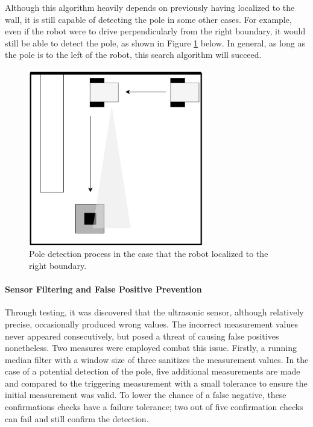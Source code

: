 \documentclass[ece]{uw-wkrpt}
\begin{document}
Although this algorithm heavily depends on previously having localized to the wall, it is still capable of detecting the pole in some other cases. For example, even if the robot were to drive perpendicularly from the right boundary, it would still be able to detect the pole, as shown in Figure \ref{fig:SAEX3} below. In general, as long as the pole is to the left of the robot, this search algorithm will succeed.

\begin{figure}
    \centering
    \includegraphics[width=3in]{res/SA-example3}
    \caption[Pole detection from right boundary]
          {Pole detection process in the case that the robot localized to the right boundary.}
    \label{fig:SAEX3}
\end{figure}

\paragraph{Sensor Filtering and False Positive Prevention}

Through testing, it was discovered that the ultrasonic sensor, although relatively precise, occasionally produced wrong values. The incorrect measurement values never appeared consecutively, but posed a threat of causing false positives nonetheless. Two measures were employed combat this issue. Firstly, a running median filter with a window size of three sanitizes the measurement values. In the case of a potential detection of the pole, five additional measurements are made and compared to the triggering measurement with a small tolerance to ensure the initial measurement was valid. To lower the chance of a false negative, these confirmations checks have a failure tolerance; two out of five confirmation checks can fail and still confirm the detection.
\end{document}
